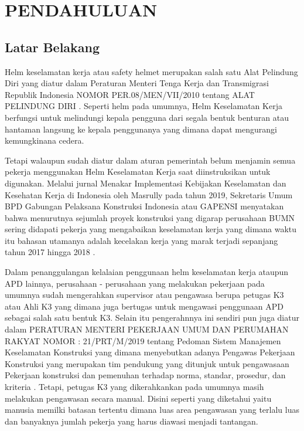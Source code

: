 \chapter{PENDAHULUAN}
\label{chap:pendahuluan}


\section{Latar Belakang}
\label{sec:latarbelakang}

Helm keselamatan kerja atau safety helmet merupakan salah satu Alat Pelindung Diri yang diatur dalam 
Peraturan Menteri Tenga Kerja dan Transmigrasi Republik Indonesia NOMOR PER.08/MEN/VII/2010 tentang ALAT PELINDUNG DIRI \cite{suratkementriantenagakerja}. Seperti helm pada umumnya, Helm Keselamatan Kerja berfungsi untuk melindungi kepala pengguna dari segala bentuk benturan atau hantaman langsung ke kepala penggunanya yang dimana dapat mengurangi kemungkinana cedera.

Tetapi walaupun sudah diatur dalam aturan pemerintah belum menjamin semua pekerja menggunakan Helm Keselamatan Kerja saat diinstruksikan untuk digunakan. Melalui jurnal Menakar Implementasi Kebijakan Keselamatan dan Kesehatan Kerja di Indonesia oleh Masrully pada tahun 2019, Sekretaris Umum BPD Gabungan Pelaksana Konstruksi Indonesia atau GAPENSI menyatakan bahwa menurutnya sejumlah proyek konstruksi yang digarap perusahaan BUMN sering didapati pekerja yang mengabaikan keselamatan kerja yang dimana waktu itu bahasan utamanya adalah kecelakan kerja yang marak terjadi sepanjang tahun 2017 hingga 2018 \cite{masrully2019menakar}.

Dalam penanggulangan kelalaian penggunaan helm keselamatan kerja ataupun APD lainnya, perusahaan - perusahaan yang melakukan pekerjaan pada umumnya sudah mengerahkan supervisor atau pengawasa berupa petugas K3 atau Ahli K3 yang dimana juga bertugas untuk mengawasi penggunaan APD sebagai salah satu bentuk K3. Selain itu pengerahnnya  ini sendiri pun juga diatur dalam PERATURAN MENTERI PEKERJAAN UMUM DAN PERUMAHAN RAKYAT NOMOR : 21/PRT/M/2019 tentang Pedoman Sistem Manajemen Keselamatan Konstruksi yang dimana menyebutkan adanya Pengawas Pekerjaan Konstruksi yang merupakan tim pendukung yang ditunjuk untuk pengawasaan Pekerjaan konstruksi dan pemenuhan terhadap norma, standar, prosedur, dan kriteria \cite{permen21prtm2019pedomansistemmanajemenkeselamatankonstruksi}. Tetapi, petugas K3 yang dikerahkankan pada umumnya masih melakukan pengawasan secara manual. Disini seperti yang diketahui yaitu manusia memilki batasan tertentu dimana luas area pengawasan yang terlalu luas dan banyaknya jumlah pekerja yang harus diawasi menjadi tantangan.

